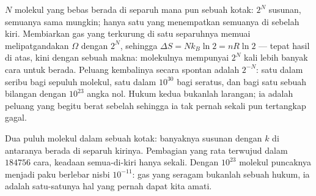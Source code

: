 \begin{example}\label{ex:b1:second-law-entropy:count}
$N$ molekul yang bebas berada di separuh mana pun sebuah kotak: $2^N$ susunan,
semuanya sama mungkin; hanya satu yang menempatkan semuanya di sebelah kiri. Membiarkan gas
yang terkurung di satu separuhnya memuai melipatgandakan $\Omega$ dengan $2^N$, sehingga $\Delta S =
Nk_B\ln2 = nR\ln2$ --- tepat hasil  di atas, kini dengan
sebuah makna: molekulnya mempunyai $2^N$ kali lebih banyak cara untuk berada. Peluang
kembalinya secara spontan adalah $2^{-N}$: satu dalam seribu bagi sepuluh
molekul, satu dalam $10^{30}$ bagi seratus, dan bagi satu  sebuah bilangan dengan
$10^{23}$ angka nol. Hukum kedua bukanlah larangan; ia adalah peluang
yang begitu berat sebelah sehingga ia tak pernah sekali pun tertangkap gagal.
\end{example}

\begin{omfigure}

{\small Dua puluh molekul dalam sebuah kotak: banyaknya susunan dengan $k$
di antaranya berada di separuh kirinya. Pembagian yang rata terwujud dalam $184756$ cara,
keadaan semua-di-kiri hanya sekali. Dengan $10^{23}$ molekul puncaknya menjadi paku
berlebar nisbi $10^{-11}$: gas yang seragam bukanlah sebuah hukum, ia adalah
satu-satunya hal yang pernah dapat kita amati.}
\end{omfigure}

